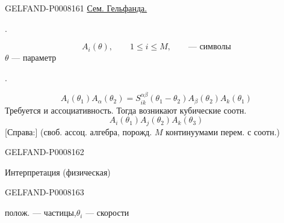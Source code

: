 \begin{GelfandAdjacentEvidence}{GELFAND-P000816}{1}
\qquad \uline{Сем. Гельфанда.}

.

\[
A_i(\theta),\qquad 1\le i\le M,\qquad\text{— символы}
\]
\(\theta\) — параметр

.

\begin{equation*}
A_i(\theta_1)A_\alpha(\theta_2)
=S_{ik}^{\alpha\beta}(\theta_1-\theta_2)A_\beta(\theta_2)A_k(\theta_1)\tag{1}
\end{equation*}
Требуется и ассоциативность. Тогда возникают кубические соотн.
\[
A_i(\theta_1)A_j(\theta_2)A_k(\theta_3)
\]
[Справа:] (своб. ассоц. алгебра, порожд. \(M\) континуумами перем. с соотн.)
\end{GelfandAdjacentEvidence}
\begin{GelfandAdjacentEvidence}{GELFAND-P000816}{2}


Интерпретация (физическая)

\end{GelfandAdjacentEvidence}
\begin{GelfandAdjacentEvidence}{GELFAND-P000816}{3}

полож. — частицы,\quad \(\theta_i\) — скорости
\end{GelfandAdjacentEvidence}
